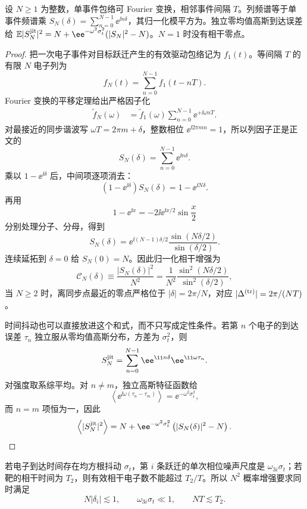 \begin{proposition}
设 $N\ge1$ 为整数，单事件包络可 Fourier 变换，相邻事件间隔 $T$。列频谱等于单事件频谱乘 $S_N(\delta)=\sum_{n=0}^{N-1}\ee^{\ii n\delta}$，其归一化模平方为。独立零均值高斯到达误差给 $\mathbb E|S_N^{\rm jit}|^2=N+\ee^{-\omega^2\sigma_t^2}(|S_N|^2-N)$。$N=1$ 时没有相干零点。
\end{proposition}
\begin{proof}
把一次电子事件对目标跃迁产生的有效驱动包络记为 $f_1(t)$。等间隔 $T$ 的有限 $N$ 电子列为
\[
f_N(t)=\sum_{n=0}^{N-1}f_1(t-nT).
\]
Fourier 变换的平移定理给出严格因子化
\begin{align*}
\widetilde f_N(\omega)
&=\widetilde f_1(\omega)
\sum_{n=0}^{N-1}\ee^{+\ii\omega nT}.
\end{align*}
对最接近的同步谐波写 $\omega T=2\pi m+\delta$，整数相位 $\ee^{\ii2\pi mn}=1$，所以列因子正是正文的
\[
S_N(\delta)=\sum_{n=0}^{N-1}\ee^{\ii n\delta}.
\]
乘以 $1-\ee^{\ii\delta}$ 后，中间项逐项消去：
\[
(1-\ee^{\ii\delta})S_N(\delta)=1-\ee^{\ii N\delta}.
\]
再用
\[
1-\ee^{\ii x}=-2\ii \ee^{\ii x/2}\sin\frac{x}{2}
\]
分别处理分子、分母，得到
\[
S_N(\delta)
=\ee^{\ii(N-1)\delta/2}
\frac{\sin(N\delta/2)}{\sin(\delta/2)}.
\]
连续延拓到 $\delta=0$ 给 $S_N(0)=N$。因此归一化相干增强为
\[
\mathcal C_N(\delta)
\equiv\frac{|S_N(\delta)|^2}{N^2}
=\frac1{N^2}
\frac{\sin^2(N\delta/2)}{\sin^2(\delta/2)},
\]
当 $N\ge2$ 时，离同步点最近的零点严格位于 $|\delta|=2\pi/N$，对应
$|\Delta^{({\rm tr})}|=2\pi/(NT)$。

时间抖动也可以直接放进这个和式，而不只写成定性条件。若第 $n$ 个电子的到达误差 $\tau_n$ 独立服从零均值高斯分布，方差为 $\sigma_t^2$，则
\[
S_N^{\rm jit}
=\sum_{n=0}^{N-1}
 \ee^{\ii n\delta}\ee^{\ii\omega\tau_n}.
\]
对强度取系综平均。对 $n\neq m$，独立高斯特征函数给
\[
\left\langle
 \ee^{\ii\omega(\tau_n-\tau_m)}
\right\rangle
=\ee^{-\omega^2\sigma_t^2},
\]
而 $n=m$ 项恒为一，因此
\[
{
\left\langle|S_N^{\rm jit}|^2\right\rangle
=N+\ee^{-\omega^2\sigma_t^2}
\left(|S_N(\delta)|^2-N\right).}
\]
\end{proof}


若电子到达时间存在均方根抖动 $\sigma_t$，第 $i$ 条跃迁的单次相位噪声尺度是 $\omega_{3i}\sigma_t$；若靶的相干时间为 $T_2$，则有效相干电子数不能超过 $T_2/T$。所以 $N^2$ 概率增强要求同时满足
\begin{equation*}
N|\delta_i|\lesssim1,
\qquad
\omega_{3i}\sigma_t\ll1,
\qquad
NT\lesssim T_2.
\end{equation*}

